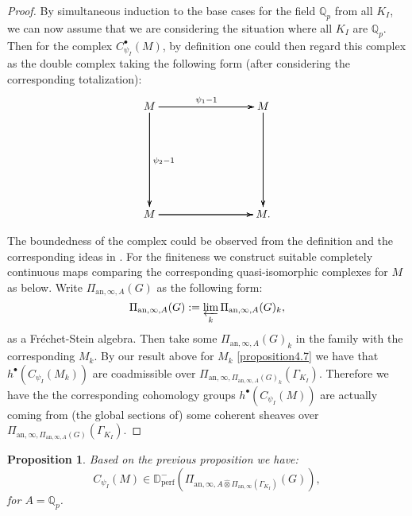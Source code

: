 \documentclass[12pt]{amsart}
\newtheorem{proposition}[theorem]{Proposition}
\theoremstyle{definition}
\numberwithin{equation}{section}
\begin{document}
\begin{proof}
By simultaneous induction to the base cases for the field $\mathbb{Q}_p$ from all $K_I$, we can now assume that we are considering the situation where all $K_I$ are $\mathbb{Q}_p$. Then for the complex $C^\bullet_{\psi_I}(M)$, by definition one could then regard this complex as the double complex taking the following form (after considering the corresponding totalization):
\[
\xymatrix@R+5pc@C+5pc{
M \ar[r]^{\psi_1-1} \ar[r] \ar[r] \ar[d]^{\psi_2-1} \ar[d] \ar[d] & M \ar[d] \ar[d] \ar[d]\\
M \ar[r] \ar[r] \ar[r]  & M. 
}
\]


\indent The boundedness of the complex could be observed from the definition and the corresponding ideas in \cite[Theorem 3.3, Theorem 3.5]{KL3}. For the finiteness we construct suitable completely continuous maps comparing the corresponding quasi-isomorphic complexes for $M$ as below. Write $\Pi_{\mathrm{an},\infty,A}(G)$ as the following form:
\begin{displaymath}
\Pi_{\mathrm{an},\infty,A }(G):=\varprojlim_k \Pi_{\mathrm{an},\infty,A}(G)_k,	
\end{displaymath}
as a Fr\'echet-Stein algebra. Then take some $\Pi_{\mathrm{an},\infty,A}(G)_k$ in the family with the corresponding $M_k$. By our result above for $M_k$ \cref{proposition4.7} we have that $h^\bullet(C_{\psi_I}(M_k))$ are coadmissible over $\Pi_{\mathrm{an},\infty,\Pi_{\mathrm{an},\infty,A}(G)_k}(\Gamma_{K_I})$. Therefore we have the the corresponding cohomology groups $h^\bullet(C_{\psi_I}(M))$ are actually coming from (the global sections of) some coherent sheaves over $\Pi_{\mathrm{an},\infty,\Pi_{\mathrm{an},\infty,A}(G)}(\Gamma_{K_I})$.




\end{proof}



\begin{proposition}
Based on the previous proposition we have:
\begin{displaymath}
C_{\psi_I}(M)\in  \mathbb{D}^-_\mathrm{perf}(\Pi_{\mathrm{an},\infty,A \widehat{\otimes} \Pi_{\mathrm{an},\infty}(\Gamma_{K_I})}(G)),	
\end{displaymath}
for $A=\mathbb{Q}_p$.	
\end{proposition}
\end{document}
